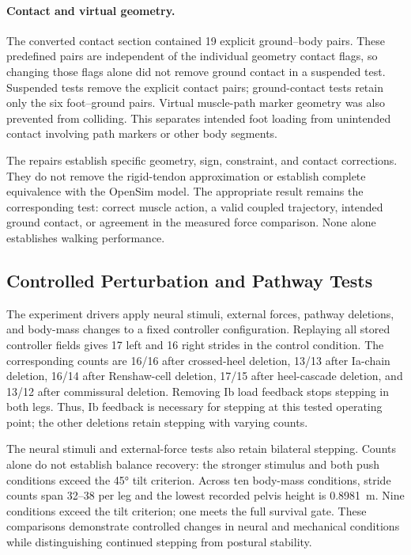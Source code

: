 \documentclass[11pt]{report}
\begin{document}
\paragraph{Contact and virtual geometry.}
The converted contact section contained 19 explicit ground--body pairs. These predefined pairs are independent of the individual geometry contact flags, so changing those flags alone did not remove ground contact in a suspended test. Suspended tests remove the explicit contact pairs; ground-contact tests retain only the six foot--ground pairs. Virtual muscle-path marker geometry was also prevented from colliding. This separates intended foot loading from unintended contact involving path markers or other body segments.

The repairs establish specific geometry, sign, constraint, and contact corrections. They do not remove the rigid-tendon approximation or establish complete equivalence with the OpenSim model. The appropriate result remains the corresponding test: correct muscle action, a valid coupled trajectory, intended ground contact, or agreement in the measured force comparison. None alone establishes walking performance.


\clearpage
\subsection{Controlled Perturbation and Pathway Tests}\label{sec:w2l_perturbation}
The experiment drivers apply neural stimuli, external forces, pathway deletions, and body-mass changes to a fixed controller configuration. Replaying all stored controller fields gives 17 left and 16 right strides in the control condition. The corresponding counts are 16/16 after crossed-heel deletion, 13/13 after Ia-chain deletion, 16/14 after Renshaw-cell deletion, 17/15 after heel-cascade deletion, and 13/12 after commissural deletion. Removing Ib load feedback stops stepping in both legs. Thus, Ib feedback is necessary for stepping at this tested operating point; the other deletions retain stepping with varying counts.

The neural stimuli and external-force tests also retain bilateral stepping. Counts alone do not establish balance recovery: the stronger stimulus and both push conditions exceed the \ang{45} tilt criterion. Across ten body-mass conditions, stride counts span 32--38 per leg and the lowest recorded pelvis height is \qty{0.8981}{\meter}. Nine conditions exceed the tilt criterion; one meets the full survival gate. These comparisons demonstrate controlled changes in neural and mechanical conditions while distinguishing continued stepping from postural stability.
\end{document}

